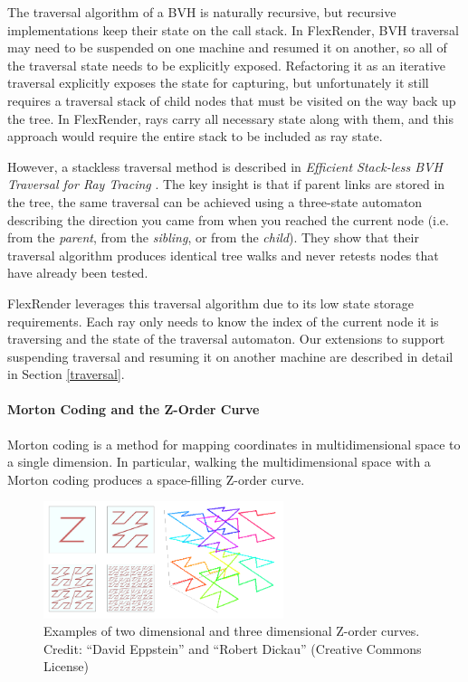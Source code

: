 \documentclass[a4paper,twoside]{article}
\begin{document}
The traversal algorithm of a BVH is naturally recursive, but recursive
implementations keep their state on the call stack. In FlexRender, BVH traversal may need
to be suspended on one machine and resumed it on another, so
all of the traversal state needs to be explicitly exposed. Refactoring it as an iterative
traversal explicitly exposes the state for capturing, but unfortunately it still
requires a traversal stack of child nodes that must be visited on the way back
up the tree. In FlexRender, rays carry all necessary state along with them,
and this approach would require the entire stack to be included as ray state.

However, a stackless traversal method is described in
\emph{Efficient Stack-less BVH Traversal for Ray Tracing} \cite{hapala:2011}.
The key insight is that if parent links are stored in the tree, the same
traversal can be achieved using a three-state automaton describing the direction
you came from when you reached the current node (i.e. from the \emph{parent},
from the \emph{sibling}, or from the \emph{child}). They show that their
traversal algorithm produces identical tree walks and never retests nodes that
have already been tested.

FlexRender leverages this traversal algorithm due to its low state storage
requirements. Each ray only needs to know the index of the current node it is
traversing and the state of the traversal automaton. Our extensions to support
suspending traversal and resuming it on another machine are described in detail
in Section \ref{traversal}.

\paragraph{Morton Coding and the Z-Order Curve}
Morton coding is a method for mapping coordinates in multidimensional space to
a single dimension. In particular, walking the multidimensional space with a
Morton coding produces a space-filling Z-order curve.

\begin{figure}[h!]
    \centering
    \includegraphics[width=70mm]{figures/zorder.png}
    \caption{Examples of two dimensional and three dimensional Z-order curves. Credit: ``David Eppstein'' and ``Robert Dickau'' (Creative Commons License)}
    \label{fig:zorder}
\end{figure}
\end{document}
